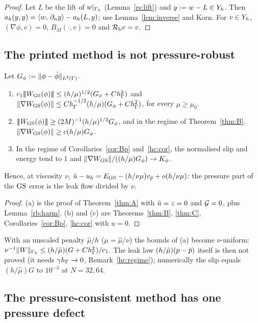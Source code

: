 \begin{proof}
Let $L$ be the lift of $w|_{\Gamma_h}$ (Lemma~\ref{rs:lift}) and $y:=w-L\in Y_h$. Then $a_h(y,y)=\langle w,\, \partial_n y\rangle-a_h(L,y)$; use Lemma~\ref{lem:inverse} and Korn. For $v\in Y_h$, $(\nabla\phi,v)=0$, $B_M(\cdot,v)=0$ and $\mathcal R_{\mathrm b} v=v$.
\end{proof}

\subsection{The printed method is not pressure-robust}

\begin{theorem}[$\GS$]\label{rb:gs}
Let $G_\phi:=\lVert \phi-\bar\phi\rVert_{L^2(\Gamma)}$.
\begin{enumerate}[label=(\alph*)]
\item $c_1|\!|\!|W_{\mathrm{GS}}(\phi)|\!|\!|\le(h/\mu)^{1/2}(G_\phi+Ch_\Gamma^2)$ and $\lVert \nabla W_{\mathrm{GS}}(\phi)\rVert\le Ch_\Gamma^{-1/2}(h/\mu)(G_\phi+Ch_\Gamma^2)$, for every $\mu\ge\mu_0$.
\item $|\!|\!|W_{\mathrm{GS}}(\phi)|\!|\!|\ge(2M)^{-1}(h/\mu)^{1/2}G_\phi$, and in the regime of Theorem~\ref{thm:B}, $\lVert \nabla W_{\mathrm{GS}}(\phi)\rVert\ge c(h/\mu)G_\phi$.
\item In the regime of Corollaries~\ref{cor:Bp} and~\ref{hc:cor}, the normalised slip and energy tend to $1$ and $\lVert \nabla W_{\mathrm{GS}}\rVert/((h/\mu)G_\phi)\to K_\phi$.
\end{enumerate}
Hence, at viscosity $\nu$, $\tilde u-u_h=E_{\mathrm{GS}}-(h/\nu\mu)v_{\tilde p}+o(h/\nu\mu)$: the pressure part of the $\GS$ error is the leak flow divided by $\nu$.
\end{theorem}

\begin{proof}
(a) is the proof of Theorem~\ref{thm:A} with $\tilde u=z=0$ and $\mathcal G=0$, plus Lemma~\ref{rb:harm}. (b) and (c) are Theorems~\ref{thm:B}, \ref{thm:C}, Corollaries~\ref{cor:Bp}, \ref{hc:cor} with $u=0$.
\end{proof}

With an unscaled penalty $\hat\mu/h$ ($\mu=\hat\mu/\nu$) the bounds of (a) become $\nu$-uniform: $\nu^{-1}\lVert W\rVert_{\Gamma_h}\le(h/\hat\mu)(G+Ch_\Gamma^2)/c_1$. The leak law $(h/\hat\mu)(p-\bar p)$ itself is then not proved (it needs $\gamma h_\Gamma\to0$, Remark~\ref{hc:regime}); numerically the slip equals $(h/\hat\mu)G$ to $10^{-3}$ at $N=32,64$.

\subsection{The pressure-consistent method has one pressure defect}

